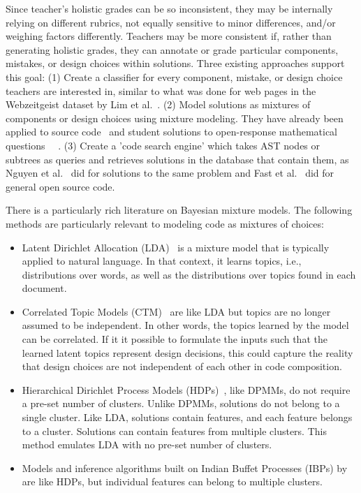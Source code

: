 Since teacher's holistic grades can be so inconsistent, they may be internally relying on different rubrics, not equally sensitive to minor differences, and/or weighing factors differently. Teachers may be more consistent if, rather than generating holistic grades, they can annotate or grade particular components, mistakes, or design choices within solutions. Three existing approaches support this goal: (1) Create a classifier for every component, mistake, or design choice teachers are interested in, similar to what was done for web pages in the Webzeitgeist dataset by Lim et al.~\cite{lim2012learning}. (2) Model solutions as mixtures of components or design choices using mixture modeling. They have already been applied to source code~\cite{} and student solutions to open-response mathematical questions~\cite{} ~\cite{binkley2014understanding,Linstead}. (3) Create a 'code search engine' which takes AST nodes or subtrees as queries and retrieves solutions in the database that contain them, as Nguyen et al.~\cite{codewebs} did for solutions to the same problem and Fast et al.~\cite{codex} did for general open source code.

There is a particularly rich literature on Bayesian mixture models. The following methods are particularly relevant to modeling code as mixtures of choices:
\begin{itemize}
\item Latent Dirichlet Allocation (LDA)~\cite{bleiLDA} is a mixture model that is typically applied to natural language. In that context, it learns topics, i.e., distributions over words, as well as the distributions over topics found in each document. %
\item Correlated Topic Models (CTM)~\cite{} are like LDA but topics are no longer assumed to be independent. In other words, the topics learned by the model can be correlated. If it it possible to formulate the inputs such that the learned latent topics represent design decisions, this could capture the reality that design choices are not independent of each other in code composition.
\item Hierarchical Dirichlet Process Models (HDPs)~\cite{}, like DPMMs, do not require a pre-set number of clusters. Unlike DPMMs, solutions do not belong to a single cluster. Like LDA, solutions contain features, and each feature belongs to a cluster. Solutions can contain features from multiple clusters. This method emulates LDA with no pre-set number of clusters. 
\item Models and inference algorithms built on Indian Buffet Processes (IBPs) by \citet{doshi2009indian} are like HDPs, but individual features can belong to multiple clusters.
\end{itemize}

